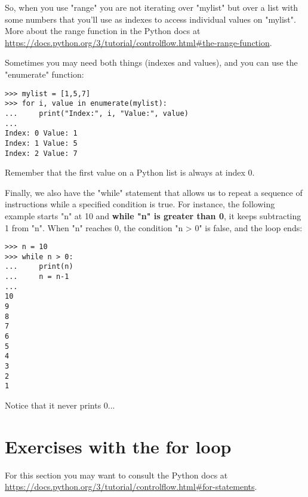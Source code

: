 So, when you use "range" you are not iterating over "mylist" but over a list with some numbers that you'll use as indexes to access individual values on "mylist". More about the range function in the Python docs at \url{https://docs.python.org/3/tutorial/controlflow.html#the-range-function}.

Sometimes you may need both things (indexes and values), and you can use the "enumerate" function:

\begin{lstlisting}
>>> mylist = [1,5,7]
>>> for i, value in enumerate(mylist):
...     print("Index:", i, "Value:", value)
... 
Index: 0 Value: 1
Index: 1 Value: 5
Index: 2 Value: 7
\end{lstlisting}

Remember that the first value on a Python list is always at index 0. 

Finally, we also have the "while" statement that allows us to repeat a sequence of instructions while a specified condition is true. For instance, the following example starts "n" at 10 and \textbf{while "n" is greater than 0}, it keeps subtracting 1 from "n". When "n" reaches 0, the condition "n > 0" is false, and the loop ends:

\begin{lstlisting}
>>> n = 10
>>> while n > 0:
...     print(n)
...     n = n-1
... 
10
9
8
7
6
5
4
3
2
1
\end{lstlisting}

Notice that it never prints 0...

\section{Exercises with the for loop}

For this section you may want to consult the Python docs at \url{https://docs.python.org/3/tutorial/controlflow.html#for-statements}.

